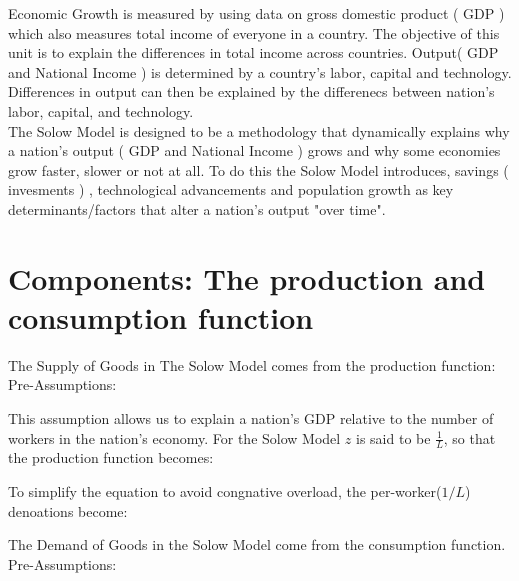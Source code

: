 \noindent Economic Growth is measured by using data on gross domestic product ( GDP ) which also measures total income of everyone in a country. 
The objective of this unit is to explain the differences in total income across countries. Output( GDP and National Income ) is determined by a country's labor, capital
and technology. Differences in output can then be explained by the differenecs between nation's labor, capital, and technology. 
\\[5pt]
The Solow Model is designed to be a methodology that dynamically explains why a nation's output ( GDP and National Income ) grows and why some economies grow faster, slower or not at all. To do this 
the Solow Model introduces, savings ( invesments ) , technological advancements and population growth as key determinants/factors that alter a nation's output "over time".

\section*{Components: The production and consumption function} 

\noindent The Supply of Goods in The Solow Model comes from the production function: 
\\[5pt]
Pre-Assumptions:




\noindent This assumption allows us to explain a nation's GDP relative to the number of workers in the nation's economy. For the Solow Model $z$ is said to be $\frac{1}{L}$, so that the production function becomes: 


\noindent To simplify the equation to avoid congnative overload, the per-worker($1/L$) denoations become:  


\noindent The Demand of Goods in the Solow Model come from the consumption function. 
\\[5pt]
Pre-Assumptions: 

